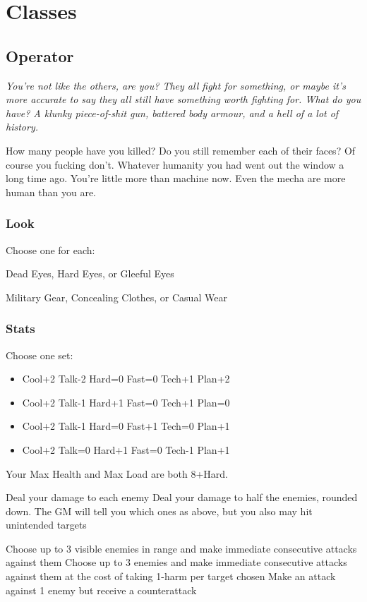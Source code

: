 \section{Classes}

\subsection{Operator}
{\itshape You're not like the others, are you? They all fight for
  something, or maybe it's more accurate to say they all still have
  something worth fighting for. What do you have? A klunky
  piece-of-shit gun, battered body armour, and a hell of a lot of
  history.

How many people have you killed? Do you still remember each of their
faces? Of course you fucking don't. Whatever humanity you had went out
the window a long time ago. You're little more than machine now. Even
the mecha are more human than you are.}

\subsubsection{Look}

Choose one for each:

Dead Eyes, Hard Eyes, or Gleeful Eyes

Military Gear, Concealing Clothes, or Casual Wear

\subsubsection{Stats}
Choose one set:
\begin{itemize}
\setlength\itemsep{0em}
\item Cool+2 Talk-2 Hard=0 Fast=0 Tech+1 Plan+2
\item Cool+2 Talk-1 Hard+1 Fast=0 Tech+1 Plan=0
\item Cool+2 Talk-1 Hard=0 Fast+1 Tech=0 Plan+1
\item Cool+2 Talk=0 Hard+1 Fast=0 Tech-1 Plan+1
\end{itemize}

Your Max Health and Max Load are both 8+Hard.

{Deal your damage to each enemy}
{Deal your damage to half the enemies, rounded down. The GM will tell you which ones}
{as above, but you also may hit unintended targets}

{Choose up to 3 visible enemies in range and make immediate consecutive attacks against them}
{Choose up to 3 enemies and make immediate consecutive attacks against them at the cost of taking 1-harm per target chosen}
{Make an attack against 1 enemy but receive a counterattack}

